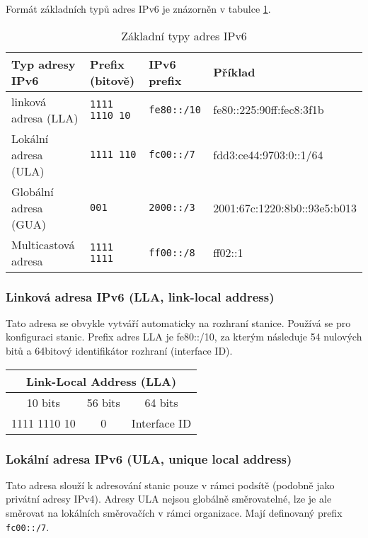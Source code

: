 Formát základních typů adres IPv6 je znázorněn v tabulce \ref{obr:IPv6_types}.
\begin{table}[h]
    \begin{center}
      \begin{tabular}{|l|l|l|l|}
        \hline
        Typ adresy IPv6 & Prefix (bitově) & IPv6 prefix & Příklad\\
        \hline\hline
        linková adresa (LLA)  & {\tt 1111 1110 10} & {\tt fe80::/10} & fe80::225:90ff:fec8:3f1b\\
        \hline
        Lokální adresa (ULA)   & {\tt 1111 110} & {\tt fc00::/7} & fdd3:ce44:9703:0::1/64 \\
        \hline
        Globální adresa (GUA)  & {\tt 001} & {\tt 2000::/3} & 2001:67c:1220:8b0::93e5:b013\\
        \hline
        Multicastová adresa & {\tt 1111 1111} & {\tt ff00::/8}&  ff02::1\\
        \hline
      \end{tabular}
    \end{center}
    \caption{Základní typy adres IPv6}\label{obr:IPv6_types}
\end{table}

\subsubsection{Linková adresa IPv6 (LLA, link-local address)}
Tato adresa se obvykle vytváří automaticky na rozhraní stanice. Používá se pro konfiguraci stanic. Prefix adres LLA je fe80::/10, za kterým následuje 54 nulových bitů a 64bitový identifikátor rozhraní (interface ID).
\begin{table}[h]
  \begin{center}
    \begin{tabular}{|c|c|c|}
        \multicolumn{3}{c}{Link-Local Address (LLA)}\\
        \hline
        10 bits &  56 bits  & 64 bits \\
        \hline
        1111 1110 10 & 0 & Interface ID \\
        \hline
    \end{tabular}
  \end{center}
\end{table}

\subsubsection{Lokální adresa IPv6 (ULA, unique local address)}\label{ula}
  Tato adresa slouží k adresování stanic pouze v rámci podsítě (podobně jako privátní adresy IPv4). Adresy ULA nejsou globálně směrovatelné, lze je ale směrovat na lokálních směrovačích v rámci organizace. Mají definovaný prefix {\tt fc00::/7}.

